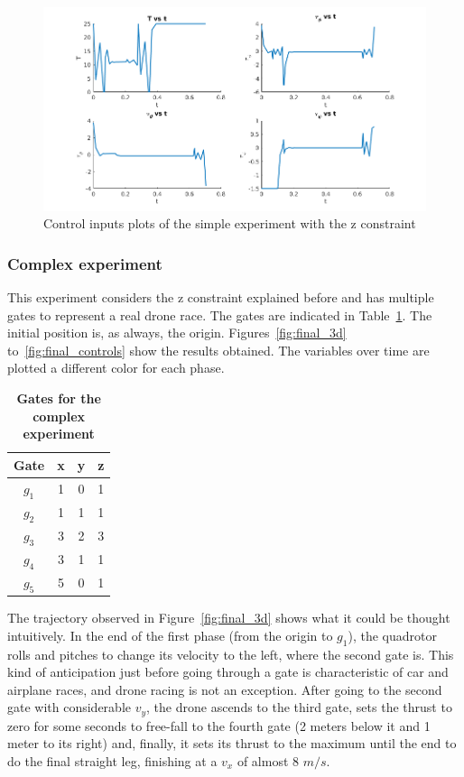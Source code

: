 \documentclass[letterpaper, 10 pt, conference]{ieeeconf}  %
\begin{document}
\begin{figure}[!htpb]
	\centering
	\includegraphics[width=1.0\linewidth]{Images/simple_zconstr/controls.png}
	\caption{Control inputs plots of the simple experiment with the z constraint}
	\label{fig:simple_zconstr_controls}
\end{figure}

\subsubsection{Complex experiment}

This experiment considers the z constraint explained before and has multiple gates to represent a real drone race. The gates are indicated in Table~\ref{tbl:gates}. The initial position is, as always, the origin. Figures~\ref{fig:final_3d} to~\ref{fig:final_controls} show the results obtained. The variables over time are plotted a different color for each phase.

\begin{table}[!htpb]
	\caption[Gates]{\bf Gates for the complex experiment}
	\label{tbl:gates}
	\centering
	\def\arraystretch{1.3}
	\setlength{\tabcolsep}{3pt}
	\begin{tabular}{cccc}
		\textbf{Gate} & \textbf{x} & \textbf{y} & \textbf{z} \\ 
		\hline
		$g_1$ & 1 & 0 & 1 \\ 
		$g_2$ & 1 & 1 & 1 \\ 
		$g_3$ & 3 & 2 & 3 \\ 
		$g_4$ & 3 & 1 & 1 \\ 
		$g_5$ & 5 & 0 & 1 \\ 
	\end{tabular}
\end{table}

The trajectory observed in Figure~\ref{fig:final_3d} shows what it could be thought intuitively. In the end of the first phase (from the origin to $g_1$), the quadrotor rolls and pitches to change its velocity to the left, where the second gate is. This kind of anticipation just before going through a gate is characteristic of car and airplane races, and drone racing is not an exception. After going to the second gate with considerable $v_y$, the drone ascends to the third gate, sets the thrust to zero for some seconds to free-fall to the fourth gate (2 meters below it and 1 meter to its right) and, finally, it sets its thrust to the maximum until the end to do the final straight leg, finishing at a $v_x$ of almost 8 $m/s$.
\end{document}
